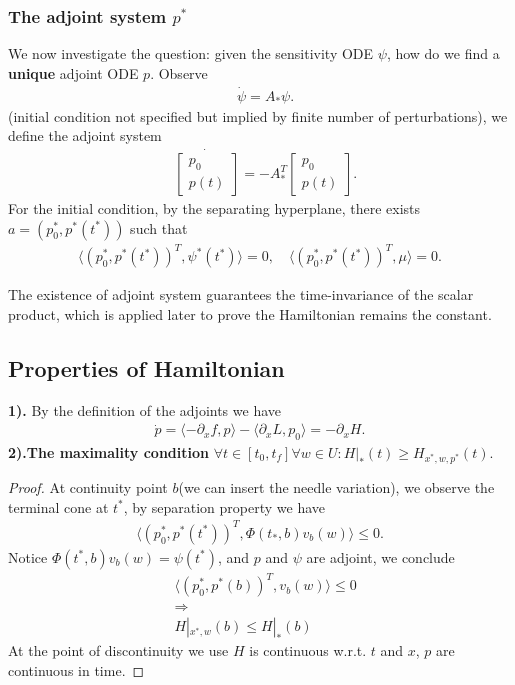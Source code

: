 \subsubsection{The adjoint system $p^*$}
We now investigate the question: given the sensitivity ODE $\psi$, how do we find a \textbf{unique} adjoint ODE $p$. Observe
\begin{align*}
	& \dot{\psi} = A_* \psi.
\end{align*}
(initial condition not specified but implied by finite number of perturbations), we define the adjoint system
\begin{align*}
	&\dot{\begin{bmatrix}
		p_0\\
		p(t)
	\end{bmatrix}} = - A_*^T 
	\begin{bmatrix}
		p_0\\
		p(t)
	\end{bmatrix}.
\end{align*} 
For the initial condition, by the separating hyperplane, there exists $ a = (p_0^*, p^*(t^*))$ such that 
\begin{align*}
	\langle (p_0^*, p^*(t^*))^T, \psi^*(t^*) \rangle = 0, \quad \langle (p_0^*, p^*(t^*))^T, \mu \rangle = 0. 
\end{align*}

The existence of adjoint system guarantees the time-invariance of the scalar product, which is applied later to prove the Hamiltonian remains the constant.  


\subsection{Properties of Hamiltonian}
\textbf{1).} By the definition of the adjoints we have
\begin{align*}
	\dot{p} = \langle -\partial_x f, p \rangle  - \langle \partial_x L , p_0 \rangle = - \partial_x H. 
\end{align*}
\textbf{2).The maximality condition} $\forall t \in [t_0, t_f] \forall w \in U: H|_*(t) \ge H_{x^*, w, p^*}(t)$. 
\begin{proof}  At continuity point $b$(we can insert the needle variation), we observe the terminal cone at $t^*$, by separation property we have
\begin{align*}
	\langle (p_0^*,  p^*(t^*))^T, \Phi(t_*, b)v_b(w) \rangle \le 0.
\end{align*}	
Notice $\Phi(t^*, b)v_b(w) = \psi(t^*)$, and $p$ and $\psi$ are adjoint, we conclude
\begin{align*}
	&\langle (p_0^*, p^*(b))^T , v_b(w) \rangle \le 0\\
	&\Rightarrow\\
	&H|_{x^*, w}(b) \le H|_{*}(b)
\end{align*}
At the point of discontinuity we use $H$ is continuous w.r.t. $t$ and $x$, $p$ are continuous in time. 
\end{proof}

